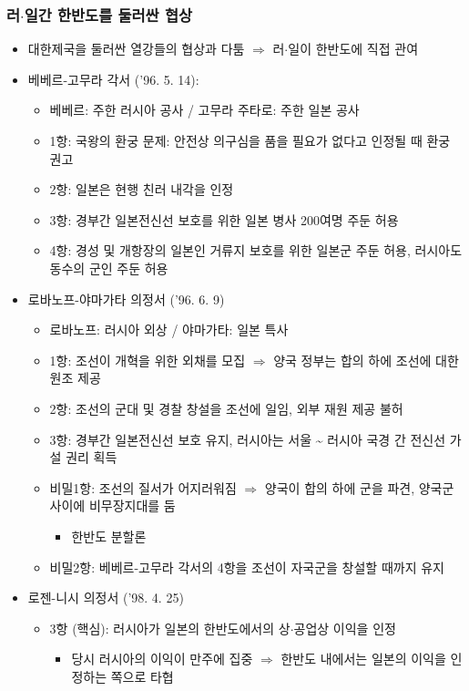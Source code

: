 \subsubsection*{러$\cdot$일간 한반도를 둘러싼 협상}
\begin{itemize}
    \item 대한제국을 둘러싼 열강들의 협상과 다툼 $\Rightarrow$ 러$\cdot$일이 한반도에 직접 관여
    \item 베베르-고무라 각서 ('96. 5. 14):
    \begin{itemize}
        \item 베베르: 주한 러시아 공사 / 고무라 주타로: 주한 일본 공사
        \item 1항: 국왕의 환궁 문제: 안전상 의구심을 품을 필요가 없다고 인정될 때 환궁 권고
        \item 2항: 일본은 현행 친러 내각을 인정
        \item 3항: 경부간 일본전신선 보호를 위한 일본 병사 200여명 주둔 허용
        \item 4항: 경성 및 개항장의 일본인 거류지 보호를 위한 일본군 주둔 허용, 러시아도 동수의 군인 주둔 허용
    \end{itemize}
    \item 로바노프-야마가타 의정서 ('96. 6. 9)
    \begin{itemize}
    \item 로바노프: 러시아 외상 / 야마가타: 일본 특사
    \item 1항: 조선이 개혁을 위한 외채를 모집 $\Rightarrow$ 양국 정부는 합의 하에 조선에 대한 원조 제공
    \item 2항: 조선의 군대 및 경찰 창설을 조선에 일임, 외부 재원 제공 불허
    \item 3항: 경부간 일본전신선 보호 유지, 러시아는 서울 \textasciitilde{} 러시아 국경 간 전신선 가설 권리 획득
    \item 비밀1항: 조선의 질서가 어지러워짐 $\Rightarrow$ 양국이 합의 하에 군을 파견, 양국군 사이에 비무장지대를 둠
    \begin{itemize}
        \item 한반도 분할론
    \end{itemize}
    \item 비밀2항: 베베르-고무라 각서의 4항을 조선이 자국군을 창설할 때까지 유지
    \end{itemize}
    \item 로젠-니시 의정서 ('98. 4. 25)
    \begin{itemize}
        \item 3항 (핵심): 러시아가 일본의 한반도에서의 상$\cdot$공업상 이익을 인정
        \begin{itemize}
            \item 당시 러시아의 이익이 만주에 집중 $\Rightarrow$ 한반도 내에서는 일본의 이익을 인정하는 쪽으로 타협
        \end{itemize}
    \end{itemize}
\end{itemize}

